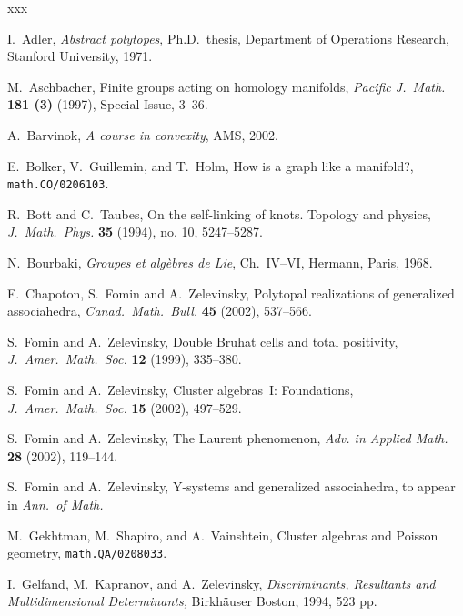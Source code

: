 \documentclass[letterpaper]{amsart}
\numberwithin{equation}{section}
\theoremstyle{definition}
\begin{document}
\begin{thebibliography}{xxx} 
 
I.~Adler, \textsl{Abstract polytopes}, Ph.D.\ thesis, 
Department of Operations Research, Stanford University, 1971. 
 
M.~Aschbacher, 
Finite groups acting on homology manifolds, 
\textsl{Pacific J.\ Math.} \textbf{181 (3)} (1997), Special Issue, 3--36. 
 
A.~Barvinok, \textsl{A course in convexity}, AMS, 2002. 
 
 
E.~Bolker, V.~Guillemin, and T.~Holm, 
How is a graph like a manifold?, 
\texttt{math.CO/0206103}. 
 
R.~Bott and C.~Taubes, 
On the self-linking of knots. Topology and physics, 
\textsl{J.~Math.\ Phys.} \textbf{35} (1994), no. 10, 5247--5287. 
 
 N.~Bourbaki, 
{\sl Groupes et alg\`ebres de Lie}, 
Ch.~IV--VI, Hermann, Paris, 1968. 
 
F.~Chapoton, S.~Fomin and A.~Zelevinsky, 
Polytopal realizations of generalized associahedra, 
\textsl{Canad.\ Math.\ Bull.}  \textbf{45} (2002), 537--566. 
 
 
S.~Fomin and A.~Zelevinsky, Double Bruhat cells and total positivity, 
\textsl{J.~Amer.\ Math.\ Soc.} {\bf 12} (1999), 335--380. 
 
S.~Fomin and A.~Zelevinsky, 
Cluster algebras~I: Foundations, 
\textsl{J.~Amer.\ Math.\ Soc.} \textbf{15} (2002), 497--529. 
 
S.~Fomin and A.~Zelevinsky, 
The Laurent phenomenon, 
\textsl {Adv. in Applied Math.} \textbf{28} (2002), 119--144. 
 
S.~Fomin and A.~Zelevinsky, 
Y-systems and generalized associahedra, 
to appear in \textsl{Ann.\ of Math.} 
 
M.~Gekhtman, M.~Shapiro, and A.~Vainshtein, 
Cluster algebras and Poisson geometry, 
{\tt math.QA/0208033}. 
 
I.~Gelfand, M.~Kapranov, and A.~Zelevinsky, 
\textsl{Discriminants, Resultants and Multidimensional Determinants,} 
Birkh\"auser Boston, 1994, 523 pp. 
 

\end{thebibliography}
\end{document}
